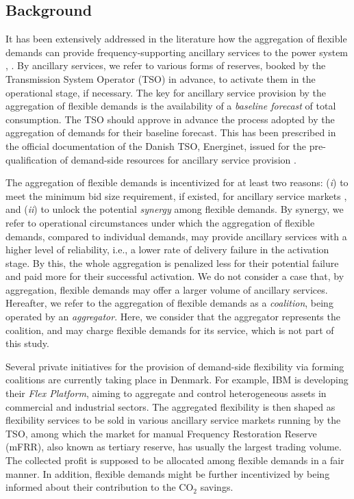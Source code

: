 \documentclass[conference]{IEEEtran}
\begin{document}
\subsection{Background}
It has been extensively addressed in the literature how the aggregation of flexible demands can provide frequency-supporting ancillary services to the power system \cite{biegel2014value}, \cite{macdonald2020demand}. By ancillary services, we refer to various forms of reserves, booked by the Transmission System Operator (TSO) in advance, to activate them in the operational stage, if necessary. The key for ancillary service provision by the aggregation of flexible demands is the availability of a \textit{baseline forecast} of total consumption. The TSO should approve in advance the process adopted by the aggregation of demands for their baseline forecast. This has been prescribed in the official documentation of the Danish TSO, Energinet, issued for the pre-qualification of demand-side resources for ancillary service provision \cite{energinet:prequalification}.

The aggregation of flexible demands is incentivized for at least two reasons: (\textit{i}) to meet the minimum bid size requirement, if existed, for ancillary service markets \cite{energinet:Systemydelser}, and (\textit{ii}) to unlock the potential \textit{synergy} among flexible demands. By synergy, we refer to operational circumstances under which the aggregation of flexible demands, compared to individual demands, may provide ancillary services with a higher level of reliability, i.e., a lower rate of delivery failure in the activation stage. By this, the whole aggregation is penalized less for their potential failure and paid more for their successful activation. We do not consider a case that, by aggregation, flexible demands may offer a larger volume of ancillary services. Hereafter, we refer to the aggregation of flexible demands as a \textit{coalition}, being operated by an \textit{aggregator}. Here, we consider that the aggregator represents the  coalition, and may charge flexible demands for its service, which is not part of this study.

Several private initiatives for the provision of demand-side flexibility via forming coalitions  are currently taking place in Denmark. For example, IBM is developing their \textit{Flex Platform}, aiming to aggregate and control heterogeneous assets in  commercial and industrial sectors. The aggregated flexibility is then shaped as flexibility services to be sold in various ancillary service markets running by the TSO, among which the market for manual Frequency Restoration Reserve (mFRR), also known as tertiary reserve, has usually the largest trading volume. The collected profit is supposed to be allocated among flexible demands in a fair manner. In addition, flexible demands might be further incentivized by being informed about their contribution to the CO$_{2}$ savings.
\end{document}
